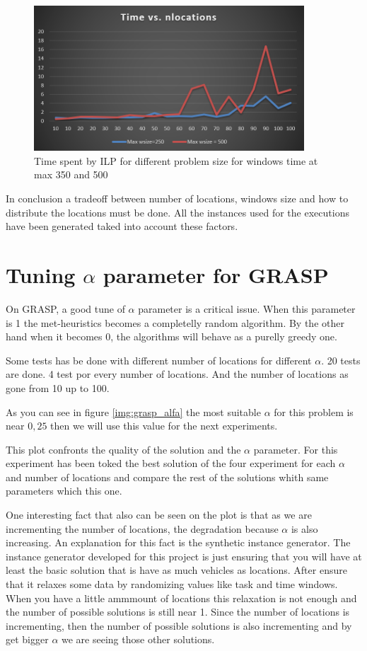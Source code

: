 \documentclass[]{report}
\begin{document}
\begin{figure}
	\caption{Time spent by ILP for different problem size for windows time at max 350 and 500}
	\label{img:time_vs_wsize}
	\centering
	\includegraphics[width=0.9\textwidth]{./imgs/ilp_wsize_aggregated.png}
\end{figure}

In conclusion a tradeoff between number of locations, windows size and how to distribute the locations must be done. All the instances used for the executions have been generated taked into account these factors.

\section{Tuning $\alpha$ parameter for GRASP}\label{s:tuning_alpha}

On GRASP, a good tune of $\alpha$ parameter is a critical issue. When this parameter is 1 the met-heuristics becomes a completelly random algorithm. By the other hand when it becomes 0, the algorithms will behave as a purelly greedy one.

Some tests has be done with different number of locations for different $\alpha$. 20 tests are done. 4 test por every number of locations. And the number of locations as gone from 10 up to 100.

As you can see in figure \ref{img:grasp_alfa} the most suitable $\alpha$ for this problem is near $0,25$ then we will use this value for the next experiments.

This plot confronts the quality of the solution and the $\alpha$ parameter. For this experiment has been toked the best solution of the four experiment for each $\alpha$ and number of locations and compare the rest of the solutions whith same parameters which this one.

One interesting fact that also can be seen on the plot is that as we are incrementing the number of locations, the degradation because $\alpha$ is also increasing. An explanation for this fact is the synthetic instance generator. The instance generator developed for this project is just ensuring that you will have at least the basic solution that is have as much vehicles as locations. After ensure that it relaxes some data by randomizing values like task and time windows. When you have a little ammmount of locations this relaxation is not enough and the number of possible solutions is still near 1. Since the number of locations is incrementing, then the number of possible solutions is also incrementing and by get bigger $\alpha$ we are seeing those other solutions.
\end{document}
